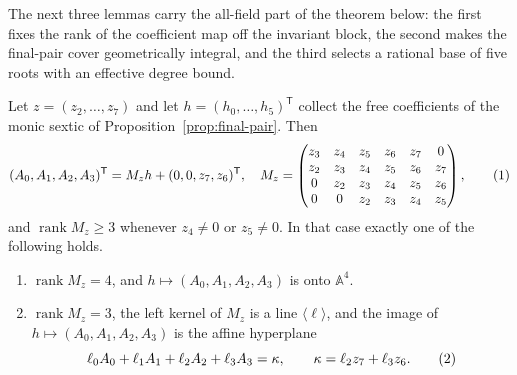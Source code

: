 The next three lemmas carry the all-field part of the theorem below: the
first fixes the rank of the coefficient map off the invariant block, the
second makes the final-pair cover geometrically integral, and the third
selects a rational base of five roots with an effective degree bound.

\begin{lemma}
\label{lem:m9-rank}%
%
Let $z=(z_2,\ldots,z_7)$ and let $h=(h_0,\ldots,h_5)^{\mathsf T}$ collect the
free coefficients of the monic sextic of Proposition~\ref{prop:final-pair}.
Then
\[
 (A_0,A_1,A_2,A_3)^{\mathsf T}=M_zh+(0,0,z_7,z_6)^{\mathsf T},
\quad
M_z=\begin{pmatrix}
 z_3&z_4&z_5&z_6&z_7&0\\
 z_2&z_3&z_4&z_5&z_6&z_7\\
 0&z_2&z_3&z_4&z_5&z_6\\
 0&0&z_2&z_3&z_4&z_5
\end{pmatrix},
\autoeqtag{eq:binary-hankel-rank}
\]
and $\operatorname{rank}M_z\geq3$ whenever $z_4\neq0$ or $z_5\neq0$.  In that
case exactly one of the following holds.
\begin{enumerate}[label=\textup{(\roman*)}]
\item $\operatorname{rank}M_z=4$, and $h\mapsto(A_0,A_1,A_2,A_3)$ is onto
      $\mathbb A^4$.
\item $\operatorname{rank}M_z=3$, the left kernel of $M_z$ is a line
      $\langle\ell\rangle$, and the image of $h\mapsto(A_0,A_1,A_2,A_3)$ is
      the affine hyperplane
      \[
       \ell_0A_0+\ell_1A_1+\ell_2A_2+\ell_3A_3=\kappa,
       \qquad\kappa=\ell_2z_7+\ell_3z_6 .
       \autoeqtag{eq:m9-affine-relation}
      \]
\end{enumerate}
\end{lemma}

